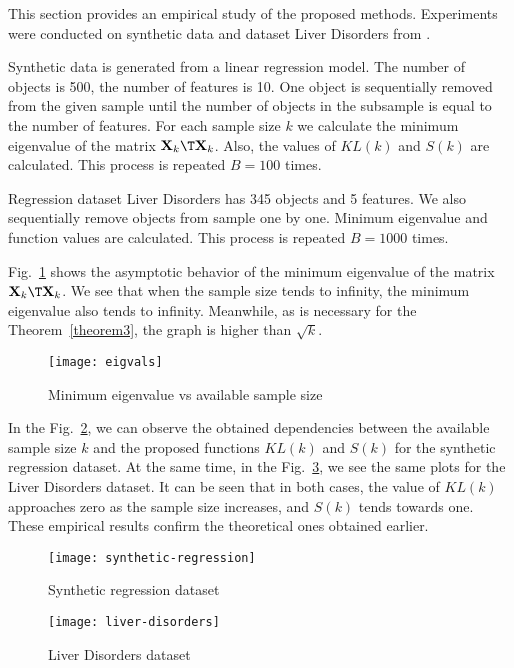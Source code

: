 \documentclass[sn-mathphys-num]{sn-jnl}%
\begin{document}
This section provides an empirical study of the proposed methods. Experiments were conducted on synthetic data and dataset Liver Disorders from \cite{UCI}. 

Synthetic data is generated from a linear regression model. The number of objects is 500, the number of features is 10. One object is sequentially removed from the given sample until the number of objects in the subsample is equal to the number of features. For each sample size $k$ we calculate the minimum eigenvalue of the matrix $\mathbf{X}_k\T \mathbf{X}_k$. Also, the values of $KL(k)$ and $S(k)$ are calculated. This process is repeated $B=100$ times.

Regression dataset Liver Disorders has 345 objects and 5 features. We also sequentially remove objects from sample one by one. Minimum eigenvalue and function values are calculated. This process is repeated $B=1000$ times.

Fig.~\ref{eigvals} shows the asymptotic behavior of the minimum eigenvalue of the matrix $\mathbf{X}_k\T \mathbf{X}_k$. We see that when the sample size tends to infinity, the minimum eigenvalue also tends to infinity. Meanwhile, as is necessary for the Theorem~\ref{theorem3}, the graph is higher than $\sqrt{k}$.

\begin{figure}[ht]
    \centering
    \texttt{[image: eigvals]}
    \caption{Minimum eigenvalue vs available sample size}
    \label{eigvals}
\end{figure}

In the Fig.~\ref{synthetic-regression}, we can observe the obtained dependencies between the available sample size $k$ and the proposed functions $KL(k)$ and $S(k)$ for the synthetic regression dataset. At the same time, in the Fig.~\ref{liver-disorders}, we see the same plots for the Liver Disorders dataset. It can be seen that in both cases, the value of $KL(k)$ approaches zero as the sample size increases, and $S(k)$ tends towards one. These empirical results confirm the theoretical ones obtained earlier.

\begin{figure}[ht]
    \centering
    \texttt{[image: synthetic-regression]}
    \caption{Synthetic regression dataset}
    \label{synthetic-regression}
\end{figure}

\begin{figure}[ht]
    \centering
    \texttt{[image: liver-disorders]}
    \caption{Liver Disorders dataset}
    \label{liver-disorders}
\end{figure}
\end{document}
